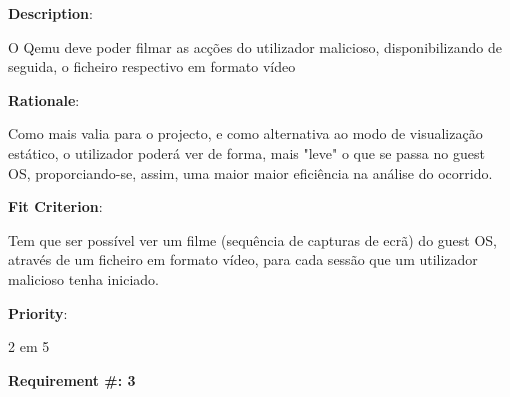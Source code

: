 \begin{description}
\item \textbf{Description}:

O Qemu deve poder filmar as acções do utilizador malicioso, disponibilizando de seguida, o ficheiro respectivo em formato vídeo \\


\item \textbf{Rationale}:

Como mais valia para o projecto, e como alternativa ao modo de visualização estático, o utilizador poderá ver de forma, mais "leve" o que
se passa no guest OS, proporciando-se, assim, uma maior maior eficiência na análise do ocorrido.


\item \textbf{Fit Criterion}:

Tem que ser possível ver um filme (sequência de capturas de ecrã) do guest OS, através de um ficheiro em formato vídeo, para cada sessão que um utilizador malicioso tenha iniciado.

\item \textbf{Priority}:

2 em 5

\end{description}

\pagebreak






\begin{minipage}{0.55\textwidth}
\begin{flushleft}\textbf{Requirement \#: 3}\end{flushleft}
\end{minipage}
\begin{minipage}{0.4\textwidth}
\end{minipage}

